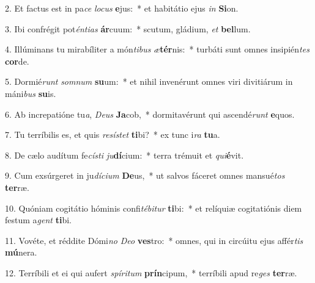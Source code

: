 2. Et factus est in pa\textit{ce} \textit{lo}\textit{cus} \textbf{e}jus:~*  et habitátio ejus \textit{in} \textbf{Si}on.\

3. Ibi confrégit pot\textit{én}\textit{ti}\textit{as} \textbf{ár}cuum:~*  scutum, gládium, \textit{et} \textbf{bel}lum.\

4. Illúminans tu mirabíliter a món\textit{ti}\textit{bus} \textit{æ}\textbf{tér}nis:~*  turbáti sunt omnes insipién\textit{tes} \textbf{cor}de.\

5. Dormié\textit{runt} \textit{som}\textit{num} \textbf{su}um:~*  et nihil invenérunt omnes viri divitiárum in máni\textit{bus} \textbf{su}is.\

6. Ab increpatióne tu\textit{a}, \textit{De}\textit{us} \textbf{Ja}cob,~*  dormitavérunt qui ascendé\textit{runt} \textbf{e}quos.\

7. Tu terríbilis es, et quis \textit{re}\textit{sís}\textit{tet} \textbf{ti}bi?~*  ex tunc i\textit{ra} \textbf{tu}a.\

8. De cælo audítum fe\textit{cís}\textit{ti} \textit{ju}\textbf{dí}cium:~*  terra trémuit et \textit{qui}\textbf{é}vit.\

9. Cum exsúrgeret in ju\textit{dí}\textit{ci}\textit{um} \textbf{De}us,~*  ut salvos fáceret omnes mansué\textit{tos} \textbf{ter}ræ.\

10. Quóniam cogitátio hóminis confi\textit{té}\textit{bi}\textit{tur} \textbf{ti}bi:~*  et relíquiæ cogitatiónis diem festum a\textit{gent} \textbf{ti}bi.\

11. Vovéte, et réddite Dómi\textit{no} \textit{De}\textit{o} \textbf{ves}tro:~*  omnes, qui in circúitu ejus affér\textit{tis} \textbf{mú}nera.\

12. Terríbili et ei qui aufert \textit{spí}\textit{ri}\textit{tum} \textbf{prín}cipum,~*  terríbili apud re\textit{ges} \textbf{ter}ræ.\

